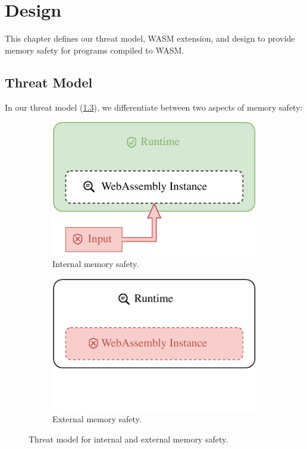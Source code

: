 \chapter{Design}
\label{ch:design}

This chapter defines our threat model, \ac{WASM} extension, and design to provide memory safety for programs compiled to \ac{WASM}.

\section{Threat Model}
\label{sec:threat-model}

In our threat model (\cref{fig:threat-model}), we differentiate between two aspects of memory safety:

\begin{figure}
    \centering
    \begin{subfigure}[T]{0.45\textwidth}
        \centering
        \includegraphics{figures/build/wasm-internal-mem-safety}
        \caption{Internal memory safety.}
        \label{fig:internal-mem-safety}
    \end{subfigure}
    \hfill
    \begin{subfigure}[T]{0.45\textwidth}
        \centering
        \includegraphics{figures/build/wasm-external-mem-safety}
        \hspace{\fill}
        \caption{External memory safety.}
        \label{fig:external-mem-safety}
    \end{subfigure}
    \caption{Threat model for internal and external memory safety.}
    \label{fig:threat-model}
\end{figure}

